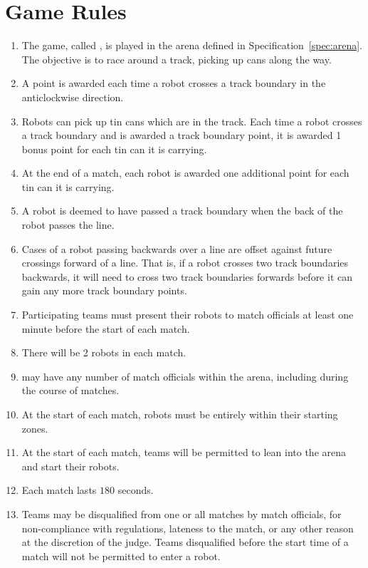 \section{Game Rules}
\label{sec:rules}

\begin{enumerate}
  \item The game, called \emph{\gamename}, is played in the arena defined in
        Specification~\ref{spec:arena}. The objective is to race around a
        track, picking up cans along the way.
  \item A point is awarded each time a robot crosses a track boundary in the
        anticlockwise direction.
  \item Robots can pick up tin cans which are in the track. Each time a robot
        crosses a track boundary and is awarded a track boundary point, it is
        awarded 1 bonus point for each tin can it is carrying.
  \item At the end of a match, each robot is awarded one additional point for
        each tin can it is carrying.
  \item A robot is deemed to have passed a track boundary when the back of the
        robot passes the line.
  \item Cases of a robot passing backwards over a line are offset against
        future crossings forward of a line. That is, if a robot crosses two
        track boundaries backwards, it will need to cross two track boundaries
        forwards before it can gain any more track boundary points.
  \item Participating teams must present their robots to match officials at
        least one minute before the start of each match.
  \item There will be 2 robots in each match.
  \item \org may have any number of match officials within the arena, including
        during the course of matches.
  \item At the start of each match, robots must be entirely within their
        starting zones.
  \item At the start of each match, teams will be permitted to lean into the
        arena and start their robots.
  \item Each match lasts $180$ seconds.
  \item Teams may be disqualified from one or all matches by match officials,
        for non-compliance with regulations, lateness to the match, or any other
        reason at the discretion of the judge. Teams disqualified before the
        start time of a match will not be permitted to enter a robot.
\end{enumerate}

